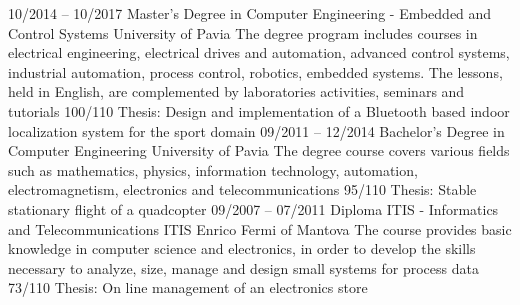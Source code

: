 \documentclass[9pt]{developercv} %
\begin{document}


\begin{entrylist}
	\entry
		{10/2014 -- 10/2017}
		{Master's Degree in Computer Engineering - Embedded and Control Systems}
		{University of Pavia}
		{The degree program includes courses in electrical engineering, electrical drives and automation, advanced control systems, industrial automation, process control, robotics, embedded systems. The lessons, held in English, are complemented by laboratories activities, seminars and tutorials}
		{100/110}
		{Thesis: Design and implementation of a Bluetooth based indoor localization system for the sport domain}
	\entry
		{09/2011 -- 12/2014}
		{Bachelor’s Degree in Computer Engineering}
		{University of Pavia}
		{The degree course covers various fields such as mathematics, physics, information technology, automation, electromagnetism, electronics and telecommunications}
		{95/110}
		{Thesis: Stable stationary flight of a quadcopter}
	\entry
		{09/2007 -- 07/2011}
		{Diploma ITIS - Informatics and Telecommunications}
		{ITIS Enrico Fermi of Mantova}
		{The course provides basic knowledge in computer science and electronics, in order to develop the skills necessary to analyze, size, manage and design small systems for process data}
		{73/110}
		{Thesis: On line management of an electronics store}
\end{entrylist}


\end{document}
